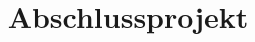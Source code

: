 

\subject{Computerpraktikum: Angewandte Protonentherapie}
\title{Abschlussprojekt}



\maketitle
\thispagestyle{empty}
\tableofcontents
\newpage

%
%
%




%
%
%

\newpage

\printbibliography{}


